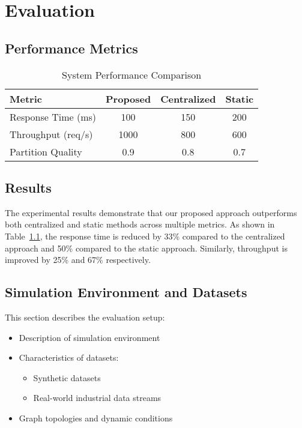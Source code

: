 \chapter{Evaluation}

\section{Performance Metrics}

\begin{table}[htbp]
\centering
\caption{System Performance Comparison}
\begin{tabular}{lccc}
\hline
Metric & Proposed & Centralized & Static \\
\hline
Response Time (ms) & 100 & 150 & 200 \\
Throughput (req/s) & 1000 & 800 & 600 \\
Partition Quality & 0.9 & 0.8 & 0.7 \\
\hline
\end{tabular}
\label{tab:performance}
\end{table}

\section{Results}

The experimental results demonstrate that our proposed approach outperforms both centralized and static methods across multiple metrics. As shown in Table~\ref{tab:performance}, the response time is reduced by 33\% compared to the centralized approach and 50\% compared to the static approach. Similarly, throughput is improved by 25\% and 67\% respectively.

\section{Simulation Environment and Datasets}
This section describes the evaluation setup:
\begin{itemize}
    \item Description of simulation environment
    \item Characteristics of datasets:
        \begin{itemize}
            \item Synthetic datasets
            \item Real-world industrial data streams
        \end{itemize}
    \item Graph topologies and dynamic conditions
\end{itemize}

